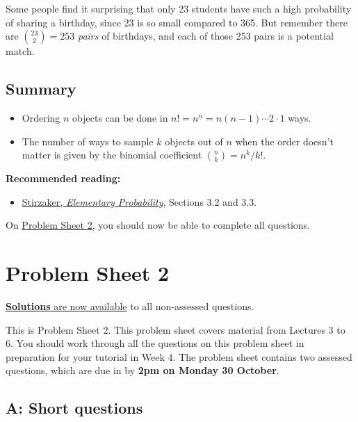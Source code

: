 \documentclass[
  a4paper,
]{book}
\providecommand{\tightlist}{%
  \setlength{\itemsep}{0pt}\setlength{\parskip}{0pt}}
\newif\ifcomm\commtrue
\theoremstyle{definition}
\theoremstyle{definition}
\theoremstyle{definition}
\theoremstyle{definition}
\theoremstyle{remark}
\begin{document}
Some people find it surprising that only 23 students have such a high probability of sharing a birthday, since 23 is so small compared to 365. But remember there are \(\binom{23}{2} = 253\) \emph{pairs} of birthdays, and each of those 253 pairs is a potential match.

\hypertarget{summary-L06}{%
\section*{Summary}\label{summary-L06}}

\begin{itemize}
\tightlist
\item
  Ordering \(n\) objects can be done in \(n! = n^{\underline{n}} = n(n-1)\cdots2\cdot1\) ways.
\item
  The number of ways to sample \(k\) objects out of \(n\) when the order doesn't matter is given by the binomial coefficient \(\binom nk = {n}^{\underline{k}}/k!\).
\end{itemize}

\textbf{Recommended reading:}

\begin{itemize}
\tightlist
\item
  \href{https://leeds.primo.exlibrisgroup.com/permalink/44LEE_INST/13rlbcs/alma991013131349705181}{Stirzaker, \emph{Elementary Probability}}, Sections 3.2 and 3.3.
\end{itemize}

On \protect\hyperlink{P2}{Problem Sheet 2}, you should now be able to complete all questions.

\hypertarget{P2}{%
\chapter*{Problem Sheet 2}\label{P2}}

\commfalse

\protect\hyperlink{P2-solutions}{\textbf{Solutions} are now available} to all non-assessed questions.

This is Problem Sheet 2. This problem sheet covers material from Lectures 3 to 6. You should work through all the questions on this problem sheet in preparation for your tutorial in Week 4. The problem sheet contains two assessed questions, which are due in by \textbf{2pm on Monday 30 October}.

\hypertarget{P2-short}{%
\section*{A: Short questions}\label{P2-short}}
\end{document}
